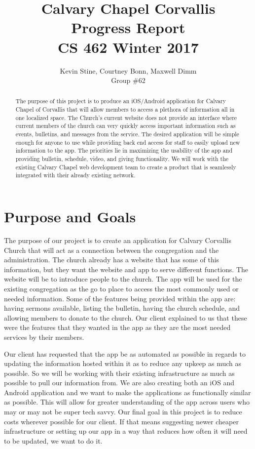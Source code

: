 \documentclass[letterpaper,10pt,draftclsnofoot,onecolumn,titlepage]{IEEEtran}
\def\name{Kevin Stine, Courtney Bonn, Maxwell Dimm}
\def\team{Calvary Chapel Corvallis}
\def\grp{Group \#62}
\begin{document}
	\title{\huge \team \\ Progress Report\\ CS 462 Winter 2017}
	\author{\large \name \\ \grp}



	\maketitle

		\begin{abstract}The purpose of this project is to produce an iOS/Android application for Calvary Chapel of Corvallis that will allow members to access a plethora of information all in one localized space.
		The Church's current website does not provide an interface where current members of the church can very quickly access important information such as events, bulletins, and messages from the service.
		The desired application will be simple enough for anyone to use while providing back end access for staff to easily upload new information to the app.
		The priorities lie in maximizing the usability of the app and providing bulletin, schedule, video, and giving functionality.
		We will work with the existing Calvary Chapel web development team to create a product that is seamlessly integrated with their already existing network.
		\end{abstract}

		\clearpage

		\section{Purpose and Goals}
		The purpose of our project is to create an application for Calvary Corvallis Church that will act as a connection between the congregation and the administration.
		The church already has a website that has some of this information, but they want the website and app to serve different functions. 
		The website will be to introduce people to the church.
		The app will be used for the existing congregation as the go to place to access the most commonly used or needed information.
		Some of the features being provided within the app are: having sermons available, listing the bulletin, having the church schedule, and allowing members to donate to the church.
		Our client explained to us that these were the features that they wanted in the app as they are the most needed services by their members.

		Our client has requested that the app be as automated as possible in regards to updating the information hosted within it as to reduce any upkeep as much as possible.
		So we will be working with their existing infrastructure as much as possible to pull our information from.
		We are also creating both an iOS and Android application and we want to make the applications as functionally similar as possible.
		This will allow for greater understanding of the app across users who may or may not be super tech savvy.
		Our final goal in this project is to reduce costs wherever possible for our client.
		If that means suggesting newer cheaper infrastructure or setting up our app in a way that reduces how often it will need to be updated, we want to do it.
\end{document}
